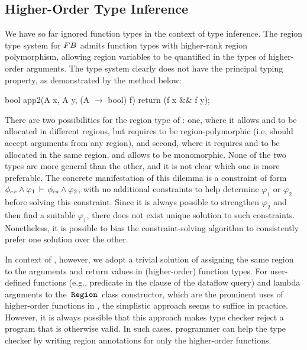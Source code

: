 \subsection{Higher-Order Type Inference}

We have so far ignored function types in the context of type
inference. The region type system for ${\sc FB}$ admits function types with
higher-rank region polymorphism, allowing region variables to be
quantified in the types of higher-order arguments. The type system
clearly does not have the principal typing property, as demonstrated
by the  method below:
\begin{codejava}
bool app2(A x, A y, (A $\rightarrow$ bool) f) 
    { return (f x && f y); }
\end{codejava}
There are two possibilities for the region type of : one,
where it allows  and  to be allocated in different regions,
but requires  to be region-polymorphic (i.e,  should accept
arguments from any region), and second, where it requires  and
 to be allocated in the same region, and allows  to be
monomorphic. None of the two types are more general than the other,
and it is not clear which one is more preferable. The concrete
manifestation of this dilemma is a constraint of form 
$\phi_{cx} \wedge \varphi_1\,\vdash\,\phi_{cs} \wedge \varphi_2$, with
no additional constraints to help determine $\varphi_1$ or $\varphi_2$
before solving this constraint. Since it is always possible to
strengthen $\varphi_2$ and then find a suitable $\varphi_1$, there
does not exist unique solution to such constraints. Nonetheless, it is
possible to bias the constraint-solving algorithm to consistently
prefer one solution over the other.

In context of \name, however, we adopt a trivial solution of
assigning the same region to the arguments and return values in
(higher-order) function types. For user-defined functions (e.g.,
predicate in the  clause of the  dataflow query)
and lambda arguments to the $\,{\tt Region}\,$ class constructor, which are the
prominent uses of higher-order functions in \name, the simplistic
approach seems to suffice in practice. However, it is always possible
that this approach makes type checker reject a program that is
otherwise valid. In such cases, programmer can help the type checker
by writing region annotations for only the higher-order functions.

